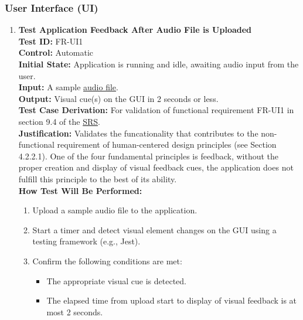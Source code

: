 \documentclass[12pt, titlepage]{article}
\begin{document}
  \subsubsection{User Interface (UI)}
  \label{FR-UI}
  \begin{enumerate}
    \item \textbf{Test Application Feedback After Audio File is Uploaded} \\
      \newline
      \textbf{Test ID:} FR-UI1 \\
      \textbf{Control:} Automatic \\
      \textbf{Initial State:} Application is running and idle, awaiting audio input from the user. \\
      \textbf{Input:} A sample \href{https://github.com/emilyperica/ScoreGen/blob/main/test/TestingDatasets/piano-samples/sample-scales/c-major-scale-on-treble-clef.wav}{audio file}. \\
      \textbf{Output:} Visual cue(s) on the GUI in 2 seconds or less. \\
      \textbf{Test Case Derivation:} For validation of functional requirement FR-UI1 in section 9.4 of the 
      \href{https://github.com/emilyperica/ScoreGen/blob/main/docs/SRS-Volere/SRS.pdf}{SRS}. \\
      \textbf{Justification:} Validates the funcationality that contributes to the non-functional requirement of
      human-centered design principles (see Section 4.2.2.1). One of the four fundamental principles is feedback, without 
      the proper creation and display of visual feedback cues, the application does not fulfill this principle to the 
      best of its ability.\\
      \textbf{How Test Will Be Performed:}
      \begin{enumerate}
          \item Upload a sample audio file to the application.
          \item Start a timer and detect visual element changes on the GUI using a testing framework (e.g., Jest).
          \item Confirm the following conditions are met:
          \begin{itemize}
              \item The appropriate visual cue is detected.
              \item The elapsed time from upload start to display of visual feedback is at most 2 seconds.
          \end{itemize}
      \end{enumerate}
    

\end{enumerate}
\end{document}
